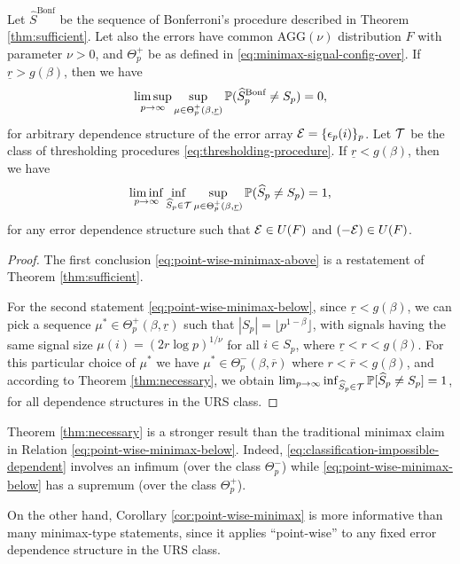 \begin{corollary}
\label{cor:point-wise-minimax}
Let $\widehat{S}^{\text{Bonf}}$ be the sequence of Bonferroni's procedure described in Theorem \ref{thm:sufficient}. 
Let also the errors have common $\text{AGG}(\nu)$ distribution $F$ with parameter $\nu>0$, and $\Theta_p^+$ be as defined in \eqref{eq:minimax-signal-config-over}.
If $\underline{r}>g(\beta)$, then we have
\begin{equation} \label{eq:point-wise-minimax-above}
    \limsup_{p\to\infty} \sup_{\mu\in\Theta_p^+(\beta, \underline{r})} \P(\widehat{S}^{\text{Bonf}}_p \neq S_p) = 0,
\end{equation}
for arbitrary dependence structure of the error array ${\cal E} = \{\epsilon_p(i)\}_p$.
Let $\cal T$ be the class of thresholding procedures \eqref{eq:thresholding-procedure}. 
If $\underline{r}<g(\beta)$, then we have
\begin{equation} \label{eq:point-wise-minimax-below}
    \liminf_{p\to\infty} \inf_{\widehat{S}_p\in \cal T} \sup_{\mu\in\Theta_p^+(\beta, \underline{r})} \P(\widehat{S}_p \neq S_p) = 1,
\end{equation}
for any error dependence structure such that ${\cal E}\in U(F)$ and ${(-\cal E)}\in U(F)$.
\end{corollary}

\begin{proof}%
The first conclusion \eqref{eq:point-wise-minimax-above} is a restatement of Theorem \ref{thm:sufficient}.

For the second statement \eqref{eq:point-wise-minimax-below}, since $\underline{r}<g(\beta)$, we can pick a sequence $\mu^*\in\Theta_p^+(\beta, \underline{r})$ such that $|S_p| = \lfloor p^{1-\beta}\rfloor$, with signals having the same signal size $\mu(i)=(2r\log{p})^{1/\nu}$ for all $i\in S_p$, where $\underline{r}<{r}<g(\beta)$.
For this particular choice of $\mu^*$ we have $\mu^*\in\Theta_p^-(\beta, \overline{r})$ where $r<\overline{r}<g(\beta)$,
and according to Theorem \ref{thm:necessary}, we obtain $\lim_{p\to\infty} \inf_{\widehat{S}_p\in \cal T} \mathbb P[\widehat{S}_p \neq S_p] = 1$, for all dependence structures in the URS class.
\end{proof}

\begin{remark}
Theorem \ref{thm:necessary} is a stronger result than the traditional minimax claim in Relation \eqref{eq:point-wise-minimax-below}.
Indeed,  \eqref{eq:classification-impossible-dependent} involves an infimum (over the class $\Theta^-_p$) while \eqref{eq:point-wise-minimax-below} has a supremum (over the class $\Theta^+_p$).

On the other hand, Corollary \ref{cor:point-wise-minimax} is more informative than many minimax-type statements, since it applies ``point-wise'' to any fixed error dependence structure in the URS class.
\end{remark}

